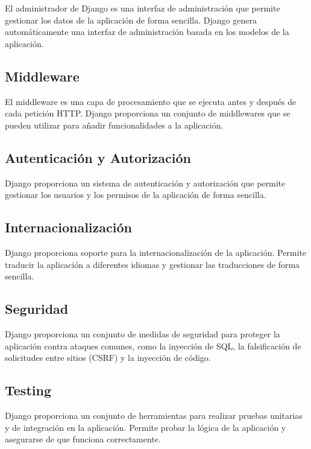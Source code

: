 \documentclass[
  a4paper,
  DIV=11,
  numbers=noendperiod,
  onepage,
  openany]{scrreprt}
\begin{document}
El administrador de Django es una interfaz de administración que permite
gestionar los datos de la aplicación de forma sencilla. Django genera
automáticamente una interfaz de administración basada en los modelos de
la aplicación.

\subsection{Middleware}\label{middleware}

El middleware es una capa de procesamiento que se ejecuta antes y
después de cada petición HTTP. Django proporciona un conjunto de
middlewares que se pueden utilizar para añadir funcionalidades a la
aplicación.

\subsection{Autenticación y
Autorización}\label{autenticaciuxf3n-y-autorizaciuxf3n}

Django proporciona un sistema de autenticación y autorización que
permite gestionar los usuarios y los permisos de la aplicación de forma
sencilla.

\subsection{Internacionalización}\label{internacionalizaciuxf3n}

Django proporciona soporte para la internacionalización de la
aplicación. Permite traducir la aplicación a diferentes idiomas y
gestionar las traducciones de forma sencilla.

\subsection{Seguridad}\label{seguridad}

Django proporciona un conjunto de medidas de seguridad para proteger la
aplicación contra ataques comunes, como la inyección de SQL, la
falsificación de solicitudes entre sitios (CSRF) y la inyección de
código.

\subsection{Testing}\label{testing}

Django proporciona un conjunto de herramientas para realizar pruebas
unitarias y de integración en la aplicación. Permite probar la lógica de
la aplicación y asegurarse de que funciona correctamente.
\end{document}
